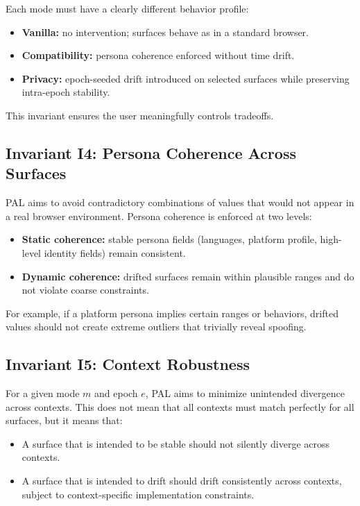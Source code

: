 \documentclass[11pt]{report}
\begin{document}
Each mode must have a clearly different behavior profile:

\begin{itemize}
    \item \textbf{Vanilla:} no intervention; surfaces behave as in a standard browser.
    \item \textbf{Compatibility:} persona coherence enforced without time drift.
    \item \textbf{Privacy:} epoch-seeded drift introduced on selected surfaces while preserving intra-epoch stability.
\end{itemize}

This invariant ensures the user meaningfully controls tradeoffs.

\subsection{Invariant I4: Persona Coherence Across Surfaces}

PAL aims to avoid contradictory combinations of values that would not appear in a real browser environment. Persona coherence is enforced at two levels:

\begin{itemize}
    \item \textbf{Static coherence:} stable persona fields (languages, platform profile, high-level identity fields) remain consistent.
    \item \textbf{Dynamic coherence:} drifted surfaces remain within plausible ranges and do not violate coarse constraints.
\end{itemize}

For example, if a platform persona implies certain ranges or behaviors, drifted values should not create extreme outliers that trivially reveal spoofing.

\subsection{Invariant I5: Context Robustness}

For a given mode $m$ and epoch $e$, PAL aims to minimize unintended divergence across contexts. This does not mean that all contexts must match perfectly for all surfaces, but it means that:

\begin{itemize}
    \item A surface that is intended to be stable should not silently diverge across contexts.
    \item A surface that is intended to drift should drift consistently across contexts, subject to context-specific implementation constraints.
\end{itemize}
\end{document}
